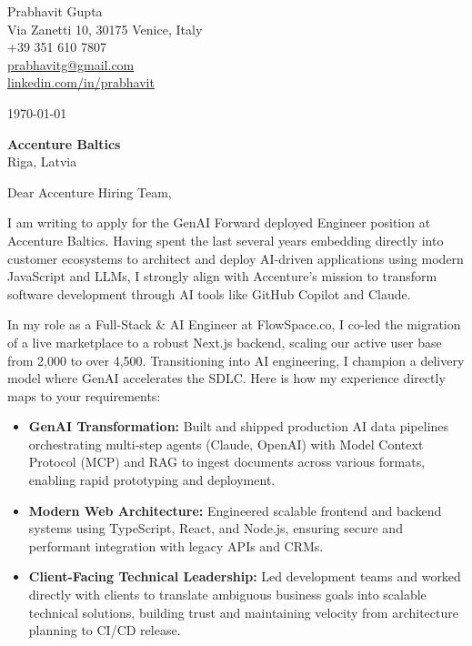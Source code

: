 \documentclass[11pt,a4paper]{article}
\begin{document}
\pagestyle{empty}

\begin{flushright}
Prabhavit Gupta \\
Via Zanetti 10, 30175 Venice, Italy \\
+39 351 610 7807 \\
\href{mailto:prabhavitg@gmail.com}{prabhavitg@gmail.com} \\
\href{https://www.linkedin.com/in/prabhavit/}{linkedin.com/in/prabhavit}
\end{flushright}

\vspace{2em}

\noindent
\today

\vspace{1em}

\noindent
\textbf{Accenture Baltics} \\
Riga, Latvia

\vspace{2em}

\noindent
Dear Accenture Hiring Team,

\vspace{1em}

\noindent
I am writing to apply for the GenAI Forward deployed Engineer position at Accenture Baltics. Having spent the last several years embedding directly into customer ecosystems to architect and deploy AI-driven applications using modern JavaScript and LLMs, I strongly align with Accenture's mission to transform software development through AI tools like GitHub Copilot and Claude.

\vspace{1em}

\noindent
In my role as a Full-Stack \& AI Engineer at FlowSpace.co, I co-led the migration of a live marketplace to a robust Next.js backend, scaling our active user base from 2,000 to over 4,500. Transitioning into AI engineering, I champion a delivery model where GenAI accelerates the SDLC. Here is how my experience directly maps to your requirements:

\vspace{1em}

\begin{itemize}
    \item \textbf{GenAI Transformation:} Built and shipped production AI data pipelines orchestrating multi-step agents (Claude, OpenAI) with Model Context Protocol (MCP) and RAG to ingest documents across various formats, enabling rapid prototyping and deployment.
    \item \textbf{Modern Web Architecture:} Engineered scalable frontend and backend systems using TypeScript, React, and Node.js, ensuring secure and performant integration with legacy APIs and CRMs.
    \item \textbf{Client-Facing Technical Leadership:} Led development teams and worked directly with clients to translate ambiguous business goals into scalable technical solutions, building trust and maintaining velocity from architecture planning to CI/CD release.
\end{itemize}
\end{document}
